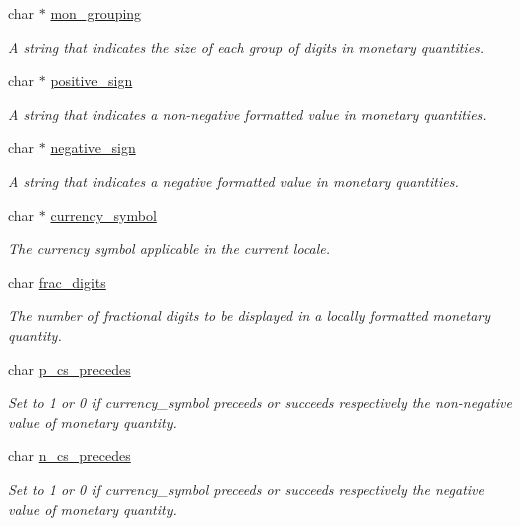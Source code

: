 \begin{DoxyCompactItemize}
char $\ast$ \mbox{\hyperlink{structlconv_a12ecf5d2f7ceb0cfe0f66fd3200eef54}{mon\+\_\+grouping}}
\begin{DoxyCompactList}\small\item\em A string that indicates the size of each group of digits in monetary quantities. \end{DoxyCompactList}\item 
char $\ast$ \mbox{\hyperlink{structlconv_a74bf5f6f32624be629f7de0dabd58a96}{positive\+\_\+sign}}
\begin{DoxyCompactList}\small\item\em A string that indicates a non-\/negative formatted value in monetary quantities. \end{DoxyCompactList}\item 
char $\ast$ \mbox{\hyperlink{structlconv_a40dbb1b1d7fdf4926145138f5d8f6f5f}{negative\+\_\+sign}}
\begin{DoxyCompactList}\small\item\em A string that indicates a negative formatted value in monetary quantities. \end{DoxyCompactList}\item 
char $\ast$ \mbox{\hyperlink{structlconv_af3657bb8bf2a83a868cdeb0b108ab921}{currency\+\_\+symbol}}
\begin{DoxyCompactList}\small\item\em The currency symbol applicable in the current locale. \end{DoxyCompactList}\item 
char \mbox{\hyperlink{structlconv_aa16e32ff4dcc95445742b5b165ffb071}{frac\+\_\+digits}}
\begin{DoxyCompactList}\small\item\em The number of fractional digits to be displayed in a locally formatted monetary quantity. \end{DoxyCompactList}\item 
char \mbox{\hyperlink{structlconv_af0651922c77fc926609bdd8746784e63}{p\+\_\+cs\+\_\+precedes}}
\begin{DoxyCompactList}\small\item\em Set to 1 or 0 if currency\+\_\+symbol preceeds or succeeds respectively the non-\/negative value of monetary quantity. \end{DoxyCompactList}\item 
char \mbox{\hyperlink{structlconv_ad118b68a229527f7e96538ac875169ad}{n\+\_\+cs\+\_\+precedes}}
\begin{DoxyCompactList}\small\item\em Set to 1 or 0 if currency\+\_\+symbol preceeds or succeeds respectively the negative value of monetary quantity. \end{DoxyCompactList}\item 

\end{DoxyCompactItemize}

